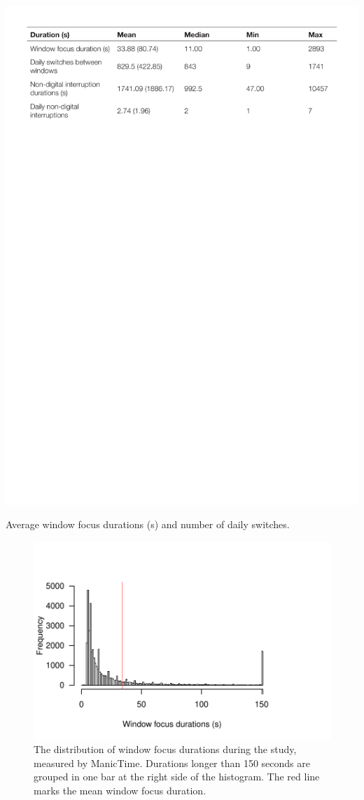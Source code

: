 \begin{table}
\centering
\centerline{\includegraphics[scale=0.7]{images/ch56/ch56_ManicTimeData.pdf}}
\caption{Average window focus durations (s) and number of daily switches.}
\label{tbl:ch56-7_manictimedata}
\end{table}

\begin{figure}
\centering
\centerline{\includegraphics[scale=0.8]{images/ch56/ch56-histMTSwitches.pdf}}
\caption{The distribution of window focus durations during the study, measured by ManicTime. Durations longer than 150 seconds are grouped in one bar at the right side of the histogram. The red line marks the mean window focus duration.}
\label{fig:ch56-7_mtdurswitches}
\end{figure}

